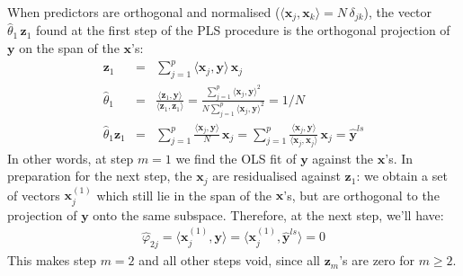 

When predictors are orthogonal and normalised ($\langle \mathbf{x}_j, \mathbf{x}_k \rangle = N \, \delta_{jk}$), the vector $\hat{\theta}_1 \, \mathbf{z}_1$ found at the first step of the PLS procedure is the orthogonal projection of $\mathbf{y}$ on the span of the $\mathbf{x}$'s:
\begin{eqnarray*}
    \mathbf{z}_1 & = & \sum_{j=1}^p \langle \mathbf{x}_j, \mathbf{y} \rangle\, \mathbf{x}_j\\
    \hat{\theta}_1 & = & \frac{\langle \mathbf{z}_1, \mathbf{y} \rangle}{\langle \mathbf{z}_1, \mathbf{z}_1 \rangle} = \frac{\sum_{j=1}^p \langle \mathbf{x}_j, \mathbf{y} \rangle ^2}{N \sum_{j=1}^p \langle  \mathbf{x}_j, \mathbf{y} \rangle ^2} = 1/N\\
    \hat{\theta}_1 \mathbf{z}_1 & = & \sum_{j=1}^p \frac{\langle \mathbf{x}_j, \mathbf{y} \rangle}{N} \, \mathbf{x}_j = \sum_{j=1}^p \frac{\langle \mathbf{x}_j, \mathbf{y} \rangle}{\langle \mathbf{x}_j, \mathbf{x}_j \rangle} \, \mathbf{x}_j = \hat{\mathbf{y}}^{ls}
\end{eqnarray*}
In other words, at step $m = 1$ we find the OLS fit of $\mathbf{y}$ against the $\mathbf{x}$'s. In preparation
for the next step, the $\mathbf{x}_j$ are residualised against $\mathbf{z}_1$: we obtain a set of vectors
$\mathbf{x}_j^{(1)}$ which still lie in the span of the $\mathbf{x}$'s, but are orthogonal to the projection
of $\mathbf{y}$ onto the same subspace. Therefore, at the next step, we'll have:
\begin{eqnarray*}
    \hat{\varphi}_{2j} = \langle \mathbf{x}_{j}^{(1)}, \mathbf{y} \rangle =  \langle \mathbf{x}_{j}^{(1)}, \hat{\mathbf{y}}^{ls} \rangle = 0
\end{eqnarray*}
This makes step $m = 2$ and all other steps void, since all $\mathbf{z}_m$'s are zero for $m \geq 2$.